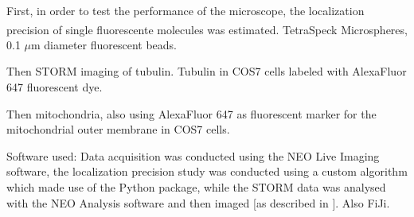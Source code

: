 First, in order to test the performance of the microscope, the localization precision of single fluorescente molecules was estimated.
TetraSpeck\textsuperscript{\texttrademark} Microspheres, 0.1 $\mu$m diameter fluorescent beads.

Then STORM imaging of tubulin. Tubulin in COS7 cells labeled with AlexaFluor 647 fluorescent dye.

Then mitochondria, also using AlexaFluor 647 as fluorescent marker for the mitochondrial outer membrane in COS7 cells.

Software used:
Data acquisition was conducted using the NEO Live Imaging software, the localization precision study was conducted using a custom algorithm which made use of the  Python package, while the STORM data was analysed with the NEO Analysis software and then imaged [as described in \cite{martens_raw_2022}].
Also FiJi.

